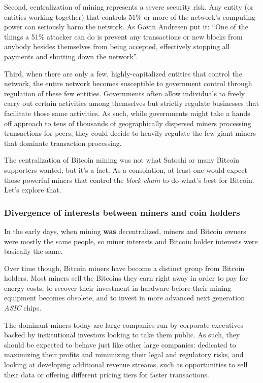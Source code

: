 \documentclass[a4paper,11pt]{article}
\begin{document}
Second, centralization of mining represents a severe security risk. Any entity (or entities working together) that controls 51\% or more of the network's computing power can seriously harm the network. As Gavin Andresen put it: ``One of the things a 51\% attacker can do is prevent any transactions or new blocks from anybody besides themselves from being accepted, effectively stopping all payments and shutting down the network''\cite{gavin51}.

Third, when there are only a few, highly-capitalized entities that control the network, the entire network becomes susceptible to government control through regulation of these few entities. 
Governments often allow individuals to freely carry out certain activities among themselves but strictly regulate businesses that facilitate those same activities. As such, while governments might take a hands off approach to tens of thousands of geographically dispersed miners processing transactions for peers, they could decide to heavily regulate the few giant miners that dominate transaction processing.  

The centralization of Bitcoin mining was not what Satoshi or many Bitcoin supporters wanted, but it's a fact. As a consolation, at least one would expect those powerful miners that control the \textit{block chain} to do what's best for Bitcoin. Let's explore that.

\subsubsection{Divergence of interests between miners and coin holders}

In the early days, when mining \textbf{was} decentralized, miners and Bitcoin owners were mostly the same people, so miner interests and Bitcoin holder interests were basically the same. 

Over time though, Bitcoin miners have become a distinct group from Bitcoin holders. Most miners sell the Bitcoins they earn right away in order to pay for energy costs, to recover their investment in hardware before their mining equipment becomes obsolete, and to invest in more advanced next generation \textit{ASIC} chips.

The dominant miners today are large companies run by corporate executives backed by institutional investors looking to take them public. As such, they should be expected to behave just like other large companies: dedicated to maximizing their profits and minimizing their legal and regulatory risks, and looking at developing additional revenue streams, such as opportunities to sell their data or offering different pricing tiers for faster transactions. 
\end{document}
